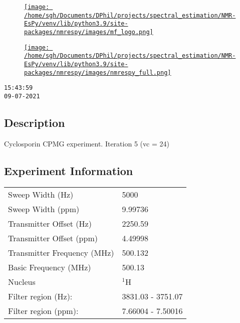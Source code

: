 \documentclass[8pt]{article}
\begin{document}
\begin{figure}[!ht]
\begin{minipage}[b][2.5cm][c]{.72\textwidth}
\href{http://foroozandeh.chem.ox.ac.uk/home}%
{\texttt{[image: /home/sgh/Documents/DPhil/projects/spectral\_estimation/NMR-EsPy/venv/lib/python3.9/site-packages/nmrespy/images/mf\_logo.png]}}
\end{minipage}
\begin{minipage}[b][2.5cm][c]{.27\textwidth}
\href{https://foroozandehgroup.github.io/NMR-EsPy}%
{\texttt{[image: /home/sgh/Documents/DPhil/projects/spectral\_estimation/NMR-EsPy/venv/lib/python3.9/site-packages/nmrespy/images/nmrespy\_full.png]}}
\end{minipage}
\end{figure}

\texttt{15:43:59\\09-07-2021}

\subsection*{Description}
Cyclosporin CPMG experiment.
Iteration 5 (vc = 24)

\subsection*{Experiment Information}
\hspace{-6pt}
\begin{tabular}{ll}
Sweep Width (Hz) & 5000 \\
Sweep Width (ppm) & 9.99736 \\
Transmitter Offset (Hz) & 2250.59 \\
Transmitter Offset (ppm) & 4.49998 \\
Transmitter Frequency (MHz) & 500.132 \\
Basic Frequency (MHz) & 500.13 \\
Nucleus & $^{1}$H \\
Filter region (Hz): & 3831.03 - 3751.07 \\
Filter region (ppm): & 7.66004 - 7.50016 \\

\end{tabular}
\end{document}
